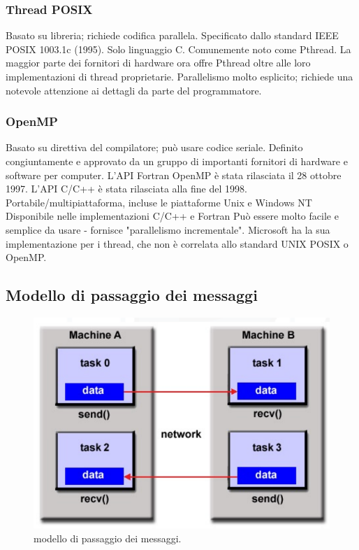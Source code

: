  \subsubsection{Thread POSIX}
 Basato su libreria;
  richiede codifica parallela.
 Specificato dallo standard IEEE POSIX 1003.1c (1995).
 Solo linguaggio C.
 Comunemente noto come Pthread.
 La maggior parte dei fornitori di hardware ora offre Pthread oltre
 alle loro implementazioni di thread proprietarie.
 Parallelismo molto esplicito;
  richiede una notevole attenzione ai dettagli da parte del programmatore.
  
  \subsubsection{OpenMP}
  Basato su direttiva del compilatore;
   può usare codice seriale.
  Definito congiuntamente e approvato da un gruppo di importanti fornitori di hardware e software per computer.
   L'API Fortran OpenMP è stata rilasciata il 28 ottobre 1997.
   L'API C/C++ è stata rilasciata alla fine del 1998.
  Portabile/multipiattaforma, incluse le piattaforme Unix e Windows NT
  Disponibile nelle implementazioni C/C++ e Fortran
  Può essere molto facile e semplice da usare - fornisce
  "parallelismo incrementale". Microsoft ha la sua implementazione per i thread, che non è correlata allo standard UNIX POSIX o OpenMP.
  
\subsection{Modello di passaggio dei messaggi}
\begin{figure}[th]
	\centering
	\includegraphics[width=0.7\linewidth]{img/modello-di-passaggio-dei-messaggi}
	\caption{modello di passaggio dei messaggi.}
	\label{fig:modello-di-passaggio-dei-messaggi}
\end{figure}


